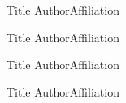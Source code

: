 \begin{talks}
\item\talk
{Title}
{Author}{Affiliation}

\item\talk
{Title}
{Author}{Affiliation}

\item\talk
{Title}
{Author}{Affiliation}

\item\talk
{Title}
{Author}{Affiliation}
\end{talks}
\room
